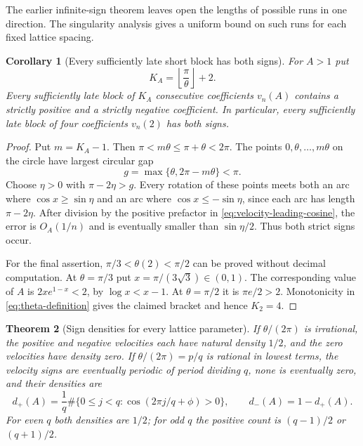 \documentclass[11pt]{article}
\numberwithin{equation}{section}
\newtheorem{theorem}{Theorem}[section]
\newtheorem{corollary}[theorem]{Corollary}
\theoremstyle{definition}
\theoremstyle{remark}
\begin{document}
The earlier infinite-sign theorem leaves open the lengths of possible
runs in one direction.  The singularity analysis gives a uniform bound
on such runs for each fixed lattice spacing.

\begin{corollary}[Every sufficiently late short block has both signs]
\label{cor:bounded-sign-gaps}
For $A>1$ put
\[
 K_A=\left\lfloor\frac\pi\theta\right\rfloor+2.
\]
Every sufficiently late block of $K_A$ consecutive coefficients $v_n(A)$
contains a strictly positive and a strictly negative coefficient.  In
particular, every sufficiently late block of four coefficients $v_n(2)$
has both signs.
\end{corollary}

\begin{proof}
Put $m=K_A-1$.  Then $\pi<m\theta\leq\pi+\theta<2\pi$.
The points $0,\theta,\ldots,m\theta$ on the circle have largest
circular gap
\[
 g=\max\{\theta,2\pi-m\theta\}<\pi.
\]
Choose $\eta>0$ with $\pi-2\eta>g$.  Every rotation of these points
meets both an arc where $\cos x\geq\sin\eta$ and an arc where
$\cos x\leq-\sin\eta$, since each arc has length $\pi-2\eta$.
After division by the positive prefactor in
\eqref{eq:velocity-leading-cosine}, the error is $O_A(1/n)$ and is
eventually smaller than $\sin\eta/2$.  Thus both strict signs occur.

For the final assertion, $\pi/3<\theta(2)<\pi/2$ can be proved without
decimal computation.  At $\theta=\pi/3$ put
$x=\pi/(3\sqrt3)\in(0,1)$.  The corresponding value of $A$ is
$2xe^{1-x}<2$, by $\log x<x-1$.  At $\theta=\pi/2$ it is
$\pi e/2>2$.  Monotonicity in \eqref{eq:theta-definition} gives the
claimed bracket and hence $K_2=4$.
\end{proof}

\begin{theorem}[Sign densities for every lattice parameter]
\label{thm:sign-density}
If $\theta/(2\pi)$ is irrational, the positive and negative velocities
each have natural density $1/2$, and the zero velocities have density
zero.  If $\theta/(2\pi)=p/q$ is rational in lowest terms, the velocity
signs are eventually periodic of period dividing $q$, none is eventually
zero, and their densities are
\begin{equation}\label{eq:rational-sign-density}
 d_+(A)=\frac1q\#\{0\leq j<q:
                     \cos(2\pi j/q+\phi)>0\},\qquad
 d_-(A)=1-d_+(A).
\end{equation}
For even $q$ both densities are $1/2$; for odd $q$ the positive count is
$(q-1)/2$ or $(q+1)/2$.
\end{theorem}
\end{document}
